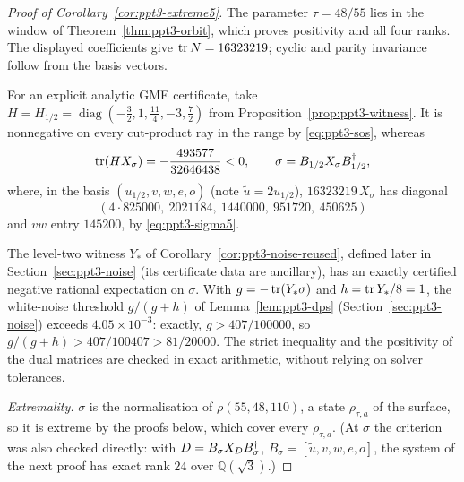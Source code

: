 \begin{proof}[Proof of Corollary~\ref{cor:ppt3-extreme5}]
The parameter $\tau=48/55$ lies in the window of
Theorem~\ref{thm:ppt3-orbit}, which proves positivity and all
four ranks. The displayed coefficients give $\operatorname{tr} N=16323219$;
cyclic and parity invariance follow from the basis vectors.

For an explicit analytic GME certificate, take
$H=H_{1/2}=\operatorname{diag}(-\tfrac32,1,\tfrac{11}4,-3,\tfrac72)$ from Proposition~\ref{prop:ppt3-witness}.
It is nonnegative on every cut-product ray in the range
by \eqref{eq:ppt3-sos}, whereas
\[
\operatorname{tr}(HX_\sigma)=-\frac{493577}{32646438}<0,\qquad
\sigma=B_{1/2}X_\sigma B_{1/2}^\dagger ,
\]
where, in the basis $(u_{1/2},v,w,e,o)$ (note $\tilde u=2u_{1/2}$), $16323219\,X_\sigma$ has
diagonal
\[
(4\cdot825000,\ 2021184,\ 1440000,\ 951720,\ 450625)
\]
and $vw$ entry $145200$, by \eqref{eq:ppt3-sigma5}.

The level-two witness $Y_*$ of Corollary~\ref{cor:ppt3-noise-reused}, defined later in Section~\ref{sec:ppt3-noise}
(its certificate data are ancillary), has an exactly certified negative rational expectation on $\sigma$. With
$g=-\operatorname{tr}(Y_*\sigma)$ and $h=\operatorname{tr} Y_*/8=1$,
the white-noise threshold $g/(g+h)$ of Lemma~\ref{lem:ppt3-dps} (Section~\ref{sec:ppt3-noise}) exceeds
$4.05\times10^{-3}$: exactly, $g>407/100000$, so $g/(g+h)>407/100407>81/20000$. The strict inequality and the
positivity of the dual matrices are checked in exact
arithmetic, without relying on solver tolerances.

\emph{Extremality.} $\sigma$ is the normalisation of $\rho(55,48,110)$, a state $\rho_{\tau,a}$ of the surface, so it is extreme by the
proofs below, which cover every $\rho_{\tau,a}$. (At $\sigma$ the criterion was also checked directly: with $D=B_\sigma X_DB_\sigma^{\dagger}$,
$B_\sigma=[\tilde u,v,w,e,o]$, the system of the next proof has exact rank $24$ over $\mathbb Q(\sqrt3)$.)
\end{proof}

